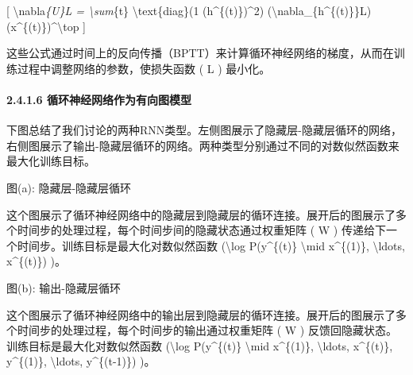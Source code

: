 {[} \textbackslash nabla\emph{\{U\}L = \textbackslash sum}\{t\}
\textbackslash text\{diag\}(1 (h\^{}\{(t)\})\^{}2)
(\textbackslash nabla\_\{h\^{}\{(t)\}\}L)
(x\^{}\{(t)\})\^{}\textbackslash top {]}


这些公式通过时间上的反向传播（BPTT）来计算循环神经网络的梯度，从而在训练过程中调整网络的参数，使损失函数
( L ) 最小化。

\paragraph{\texorpdfstring{\textbf{2.4.1.6
循环神经网络作为有向图模型}}{2.4.1.6 循环神经网络作为有向图模型}}\label{2416-ux5faaux73afux795eux7ecfux7f51ux7edcux4f5cux4e3aux6709ux5411ux56feux6a21ux578b}

下图总结了我们讨论的两种RNN类型。左侧图展示了隐藏层-隐藏层循环的网络，右侧图展示了输出-隐藏层循环的网络。两种类型分别通过不同的对数似然函数来最大化训练目标。


图(a): 隐藏层-隐藏层循环

这个图展示了循环神经网络中的隐藏层到隐藏层的循环连接。展开后的图展示了多个时间步的处理过程，每个时间步间的隐藏状态通过权重矩阵
( W ) 传递给下一个时间步。训练目标是最大化对数似然函数
(\textbackslash log P(y\^{}\{(t)\} \textbackslash mid x\^{}\{(1)\},
\textbackslash ldots, x\^{}\{(t)\}) )。


图(b): 输出-隐藏层循环

这个图展示了循环神经网络中的输出层到隐藏层的循环连接。展开后的图展示了多个时间步的处理过程，每个时间步的输出通过权重矩阵
( W ) 反馈回隐藏状态。训练目标是最大化对数似然函数 (\textbackslash log
P(y\^{}\{(t)\} \textbackslash mid x\^{}\{(1)\}, \textbackslash ldots,
x\^{}\{(t)\}, y\^{}\{(1)\}, \textbackslash ldots, y\^{}\{(t-1)\}) )。


